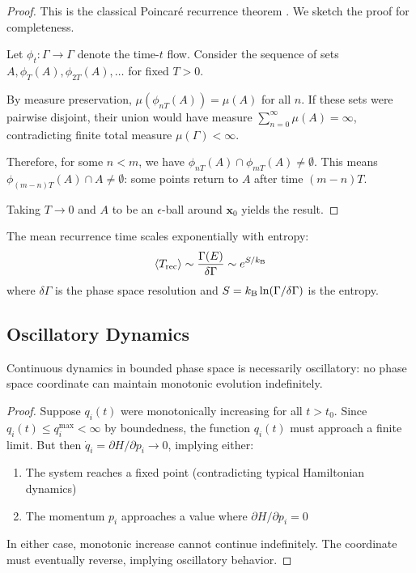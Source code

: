 \begin{proof}
This is the classical Poincar\'{e} recurrence theorem \cite{poincare1890}. We sketch the proof for completeness.

Let $\phi_t: \Gamma \to \Gamma$ denote the time-$t$ flow. Consider the sequence of sets $A, \phi_T(A), \phi_{2T}(A), \ldots$ for fixed $T > 0$.

By measure preservation, $\mu(\phi_{nT}(A)) = \mu(A)$ for all $n$. If these sets were pairwise disjoint, their union would have measure $\sum_{n=0}^{\infty} \mu(A) = \infty$, contradicting finite total measure $\mu(\Gamma) < \infty$.

Therefore, for some $n < m$, we have $\phi_{nT}(A) \cap \phi_{mT}(A) \neq \emptyset$. This means $\phi_{(m-n)T}(A) \cap A \neq \emptyset$: some points return to $A$ after time $(m-n)T$.

Taking $T \to 0$ and $A$ to be an $\epsilon$-ball around $\mathbf{x}_0$ yields the result.
\end{proof}

\begin{corollary}
The mean recurrence time scales exponentially with entropy:
\begin{equation}
\langle T_{\text{rec}} \rangle \sim \frac{\Gamma(E)}{\delta\Gamma} \sim e^{S/k_{\mathrm{B}}}
\label{eq:recurrence_time}
\end{equation}
where $\delta\Gamma$ is the phase space resolution and $S = k_{\mathrm{B}} \ln(\Gamma/\delta\Gamma)$ is the entropy.
\end{corollary}

\subsection{Oscillatory Dynamics}

\begin{proposition}
\label{prop:oscillatory}
Continuous dynamics in bounded phase space is necessarily oscillatory: no phase space coordinate can maintain monotonic evolution indefinitely.
\end{proposition}

\begin{proof}
Suppose $q_i(t)$ were monotonically increasing for all $t > t_0$. Since $q_i(t) \leq q_i^{\max} < \infty$ by boundedness, the function $q_i(t)$ must approach a finite limit. But then $\dot{q}_i = \partial H/\partial p_i \to 0$, implying either:
\begin{enumerate}
    \item The system reaches a fixed point (contradicting typical Hamiltonian dynamics)
    \item The momentum $p_i$ approaches a value where $\partial H/\partial p_i = 0$
\end{enumerate}

In either case, monotonic increase cannot continue indefinitely. The coordinate must eventually reverse, implying oscillatory behavior.
\end{proof}

